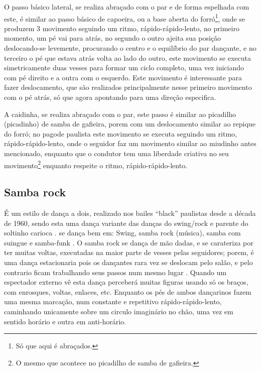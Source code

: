O passo básico lateral, se realiza abraçado com o par  e de forma espelhada com este, 
é similar ao passo básico de capoeira,
ou a base aberta do forró\footnote{Só que aqui é abraçados.},
onde se produzem 3 movimento seguindo um ritmo, rápido-rápido-lento,
no primeiro momento, um pé vai para atrás, 
no segundo o outro ajeita sua posição deslocando-se levemente, 
procurando o centro e o equilíbrio do par dançante, e
no terceiro o pé que estava atrás volta ao lado do outro,
este movimento se executa simetricamente duas vesses para formar um ciclo completo,  
uma vez iniciando com pé direito e a outra com o esquerdo.
Este movimento é interessante para fazer deslocamento, 
que são realizados principalmente nesse primeiro movimento com o pé atrás, 
só que agora apontando para uma direção especifica.

A caidinha, se realiza abraçado com o par, 
este passo é similar ao picadilho (picadinho) de samba de gafieira,
porem com um deslocamento similar ao repique do forró;
no pagode paulista este movimento se executa seguindo um ritmo, rápido-rápido-lento,
onde o seguidor faz um movimento similar ao miudinho antes mencionado,
enquanto que o condutor tem uma liberdade criativa no 
seu movimento\footnote{O mesmo que acontece no picadilho de samba de gafieira.} 
enquanto respeite o ritmo, rápido-rápido-lento.

\subsection{Samba rock}
É um estilo de dança a dois, realizado nos bailes ``black'' paulistas desde a década de 1960, 
sendo esta uma dança variante das danças do swing/rock e parente do soltinho carioca \cite[pp. 135]{perna2002samba}.
se dança bem em: Swing, samba rock (música), samba com suingue e samba-funk \cite[pp. 135,138]{perna2002samba}.
O samba rock se dança de mão dadas, e se carateriza por ter muitas voltas,
executadas na maior parte de vesses pelas  seguidores;
porem, é uma dança estacionaria pois os dançantes rara vez se deslocam pelo salão, 
e pelo contrario ficam trabalhando seus passos num mesmo lugar  \cite[pp. 135,138]{perna2002samba}.
Quando um espectador externo vê esta dança perceberá muitas figuras usando só os braços,
com enrosques, voltas, enlaces, etc.
Enquanto os pés de ambos dançarinos fazem uma mesma marcação, num constante e repetitivo rápido-rápido-lento,
caminhando unicamente sobre um circulo imaginário no chão, uma vez em sentido horário e outra em anti-horário.

